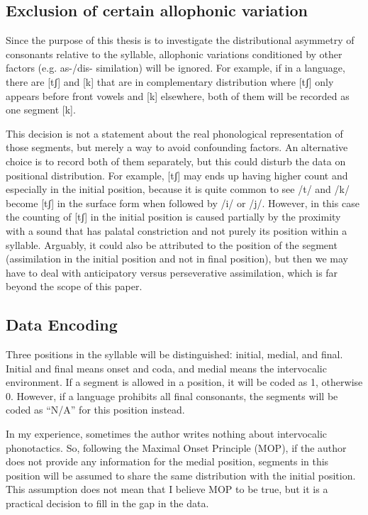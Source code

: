 \subsection{Exclusion of certain allophonic variation}

Since the purpose of this thesis is to investigate the distributional asymmetry of consonants relative to the syllable, allophonic variations conditioned by other factors (e.g. as-/dis- similation) will be ignored. 
For example, if in a language, there are [tʃ] and [k] that are in complementary distribution where [tʃ] only appears before front vowels and [k] elsewhere, both of them will be recorded as one segment [k]. 

\par
This decision is not a statement about the real phonological representation of those segments, but merely a way to avoid confounding factors.
An alternative choice is to record both of them separately, but this could disturb the data on positional distribution.
For example, [tʃ] may ends up having higher count and especially in the initial position, because it is quite common to see /t/ and /k/ become [tʃ] in the surface form when followed by /i/ or /j/.
However, in this case the counting of [tʃ] in the initial position is caused partially by the proximity with a sound that has palatal constriction and not purely its position within a syllable.
Arguably, it could also be attributed to the position of the segment (assimilation in the initial position and not in final position), but then we may have to deal with anticipatory versus perseverative assimilation, which is far beyond the scope of this paper. 

\subsection{Data Encoding}

Three positions in the syllable will be distinguishedː initial, medial, and final. Initial and final means onset and coda, and medial means the intervocalic environment. 
If a segment is allowed in a position, it will be coded as 1, otherwise 0. However, if a language prohibits all final consonants, the segments will be coded as ``N/A'' for this position instead.

\par 
In my experience, sometimes the author writes nothing about intervocalic phonotactics. So, following the Maximal Onset Principle (MOP), if the author does not provide any information for the medial position, segments in this position will be assumed to share the same distribution with the initial position. This assumption does not mean that I believe MOP to be true, but it is a practical decision to fill in the gap in the data.

